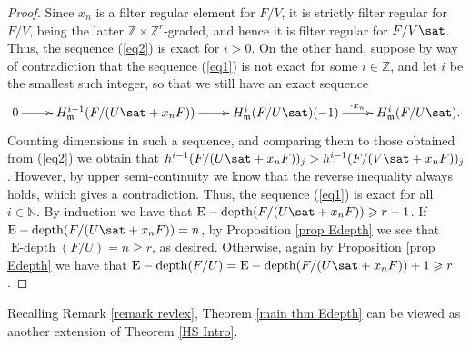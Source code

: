 \documentclass[12pt]{amsart}
\theoremstyle{definition}
\theoremstyle{definition}
\newcommand{\m}{\mathfrak{m}}
\def\NZQ{\mathbb}               %
\def\NN{{\NZQ N}}
\def\ZZ{{\NZQ Z}}
\newcommand{\ov}[1]{\overline{{#1}}}
\renewcommand{\geq}{\geqslant}
\let\ov\overline
\DeclareMathOperator{\Edepth}{E-depth}
\DeclareMathOperator{\rev}{rev}
\DeclareMathOperator{\gin}{gin}
\begin{document}
\begin{proof}
Since $x_n$ is a filter regular element for $F/V$, it is strictly filter regular for $F/V$, being the latter $\ZZ \times \ZZ^r$-graded, and hence it is filter regular for $F/V\sat$. Thus, the sequence (\ref{eq2}) is exact for $i>0$. On the other hand, suppose by way of contradiction that the sequence (\ref{eq1}) is not exact for some $i \in \ZZ$, and let $i$ be the smallest such integer, so that we still have an exact sequence
\[
\xymatrix{
0 \ar[r] & H^{i-1}_\m(F/(U\sat+x_nF)) \ar[r] & H^i_\m(F/U\sat)(-1) \ar[r]^-{\cdot x_n} & H^i_\m(F/U\sat).
}
\]
Counting dimensions in such a sequence, and comparing them to those obtained from (\ref{eq2}) we obtain that $h^{i-1}(F/(U\sat+x_nF))_j>h^{i-1}(F/(V\sat+x_nF))_j$. However, by upper semi-continuity we know that the reverse inequality always holds,  which gives a contradiction. Thus, the sequence (\ref{eq1}) is exact for all $i \in \NN$. %
By induction we have that $\Edepth(F/(U\sat+x_nF)) \geq r-1$. If $\Edepth(F/(U\sat+x_nF)) = n$, by Proposition \ref{prop Edepth} we see that $\Edepth(F/U) = n \geq r$, as desired. Otherwise, again by Proposition \ref{prop Edepth} we have that $\Edepth (F/U)  = \Edepth(F/(U\sat +x_nF)) +1 \geq r$.
\end{proof}

\noindent Recalling Remark \ref{remark revlex}, Theorem \ref{main thm Edepth} can be viewed as another extension of Theorem \ref{HS Intro}. 


\end{document}
